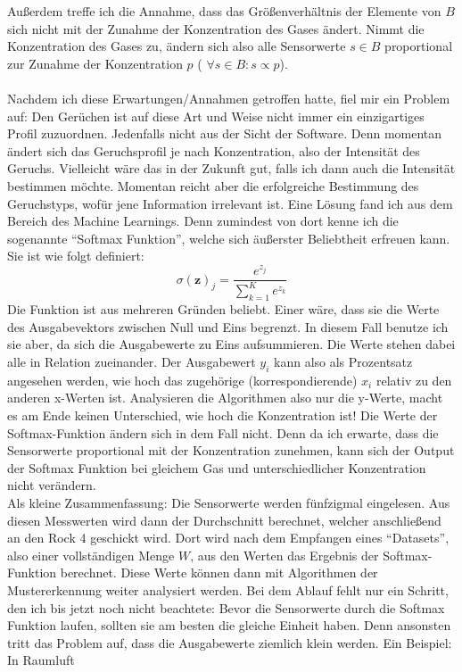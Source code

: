\documentclass[10pt]{article}
\begin{document}
Außerdem treffe ich die Annahme, dass das Größenverhältnis der Elemente von $B$ sich nicht mit der Zunahme der Konzentration des Gases ändert. Nimmt die Konzentration des Gases zu, ändern sich also
alle Sensorwerte $s \in B$ proportional zur Zunahme der Konzentration $p$ ( $\forall s \in B : s \propto p$).\\
\\
Nachdem ich diese Erwartungen/Annahmen getroffen hatte, fiel mir ein Problem auf:
Den Gerüchen ist auf diese Art und Weise nicht immer ein einzigartiges Profil zuzuordnen. Jedenfalls nicht aus der Sicht der Software. Denn momentan ändert sich das Geruchsprofil
je nach Konzentration, also der Intensität des Geruchs. Vielleicht wäre das in der Zukunft gut, falls ich dann auch die Intensität bestimmen möchte. Momentan reicht aber die
erfolgreiche Bestimmung des Geruchstyps, wofür jene Information irrelevant ist. Eine Lösung fand ich aus dem Bereich des Machine Learnings. Denn zumindest von dort kenne ich die sogenannte "`Softmax Funktion"', welche sich äußerster Beliebtheit erfreuen kann. Sie ist wie folgt definiert:
$$ \sigma (\mathbf {z} )_{j}={\frac {e^{z_{j}}}{\sum _{k=1}^{K}e^{z_{k}}}}$$
Die Funktion ist aus mehreren Gründen beliebt. Einer wäre, dass sie die Werte des Ausgabevektors zwischen Null und Eins begrenzt. In diesem Fall benutze ich sie
aber, da sich die Ausgabewerte zu Eins aufsummieren. Die Werte stehen dabei alle in Relation zueinander. Der Ausgabewert $y_i$ kann also
als Prozentsatz angesehen werden, wie hoch das zugehörige (korrespondierende) $x_i$ relativ zu den anderen x-Werten ist. Analysieren die Algorithmen also nur
die y-Werte, macht es am Ende keinen Unterschied, wie hoch die Konzentration ist! Die Werte der Softmax-Funktion ändern sich in dem Fall nicht. Denn da ich erwarte, dass 
die Sensorwerte proportional mit der Konzentration zunehmen, kann sich der Output der Softmax Funktion bei gleichem Gas und unterschiedlicher Konzentration nicht verändern.\\
Als kleine Zusammenfassung: Die Sensorwerte werden fünfzigmal eingelesen. Aus diesen Messwerten wird dann der Durchschnitt berechnet, welcher anschließend an den Rock 4 geschickt wird.
Dort wird nach dem Empfangen eines "`Datasets"', also einer vollständigen Menge $W$, aus den Werten das Ergebnis der Softmax-Funktion berechnet. Diese Werte können dann mit Algorithmen 
der Mustererkennung weiter analysiert werden. Bei dem Ablauf fehlt nur ein Schritt, den ich bis jetzt noch nicht beachtete: Bevor die Sensorwerte durch die Softmax Funktion laufen,
sollten sie am besten die gleiche Einheit haben. Denn ansonsten tritt das Problem auf, dass die Ausgabewerte ziemlich klein werden. Ein Beispiel: In Raumluft
\end{document}
